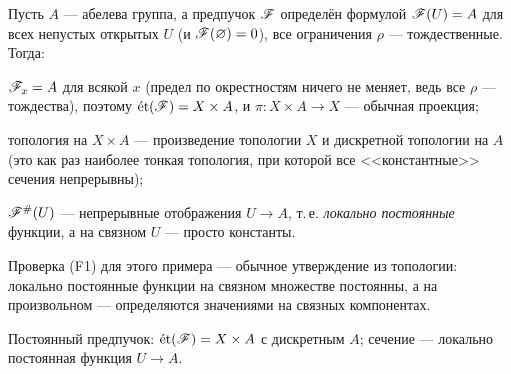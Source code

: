 \label{sec:const}

\begin{exm}\label{exm:const}
Пусть $A$ --- абелева группа, а предпучок $\Shv{F}$ определён формулой
$\Shv{F}(U)=A$ для всех непустых открытых $U$ (и
$\Shv{F}(\varnothing)=0$), все ограничения $\rho$ --- тождественные.
Тогда:
\begin{bullets}
\item $\Shv{F}_x=A$ для всякой $x$ (предел по окрестностям ничего не
 меняет, ведь все $\rho$ --- тождества), поэтому
 $\et(\Shv{F})=X\times A$, и $\pi\colon X\times A\to X$ --- обычная
 проекция;
\item топология на $X\times A$ --- произведение топологии $X$ и
  дискретной топологии на $A$ (это как раз наиболее тонкая топология,
 при которой все <<константные>> сечения непрерывны);
\item $\Shv{F}^{\#}(U)$ --- непрерывные отображения $U\to A$, т.\,е.
 \emph{локально постоянные} функции, а на связном $U$ --- просто
 константы.
\end{bullets}
Проверка (F1) для этого примера --- обычное утверждение из топологии:
локально постоянные функции на связном множестве постоянны, а на
произвольном --- определяются значениями на связных компонентах.
\end{exm}

\begin{risunok}{Постоянный предпучок: $\et(\Shv{F})=X\times A$ с
 дискретным $A$; сечение --- локально постоянная функция $U\to A$.
  \label{fig:const}}
\end{risunok}

